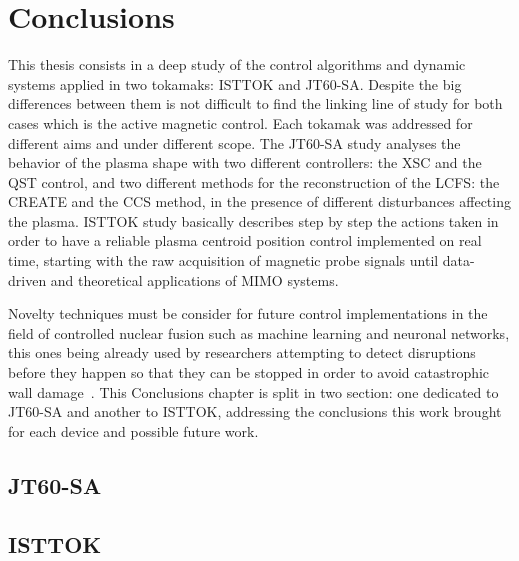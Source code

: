 \chapter{Conclusions}


This thesis consists in a deep study of the control algorithms and dynamic systems applied in two tokamaks: ISTTOK and JT60-SA. Despite the big differences between them is not difficult to find the  linking line of study for both cases which is the active magnetic control. Each tokamak was addressed for different aims and under different scope. The JT60-SA study analyses the behavior of the plasma shape with two different controllers: the XSC and the QST control, and two different methods for the reconstruction of the LCFS: the CREATE and the CCS method, in the presence of different disturbances affecting the plasma. ISTTOK study basically describes step by step the actions taken in order to have a reliable plasma centroid position control implemented on real time, starting with the raw acquisition of magnetic probe signals until  data-driven and theoretical applications of MIMO systems. \smallskip

Novelty techniques must be consider for future control implementations in the field of controlled nuclear fusion  such as machine learning and neuronal networks, this ones being already  used by researchers  attempting to detect disruptions before they happen so that they can be stopped in order to avoid catastrophic wall damage~\cite[Chapter~6]{Paluszek2020}. This Conclusions chapter is split in two section: one dedicated to JT60-SA and another to ISTTOK, addressing the conclusions  this work brought for each device and possible future work.

\section{JT60-SA}


\lipsum[1-2]

\section{ISTTOK}

